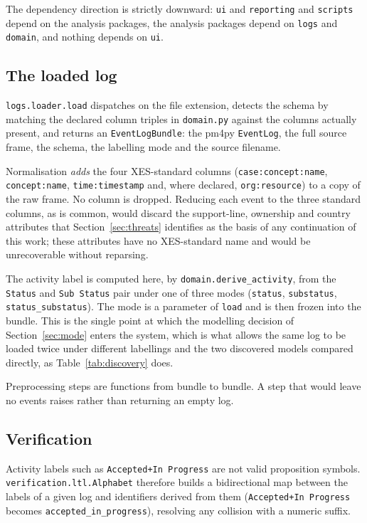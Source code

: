 \documentclass[12pt,a4paper]{article}
\newcommand{\act}[1]{\texttt{#1}}
\begin{document}
The dependency direction is strictly downward: \texttt{ui} and
\texttt{reporting} and \texttt{scripts} depend on the analysis packages, the
analysis packages depend on \texttt{logs} and \texttt{domain}, and nothing
depends on \texttt{ui}.

\subsection{The loaded log}

\texttt{logs.loader.load} dispatches on the file extension, detects the schema
by matching the declared column triples in \texttt{domain.py} against the
columns actually present, and returns an \texttt{EventLogBundle}: the pm4py
\texttt{EventLog}, the full source frame, the schema, the labelling mode and the
source filename.

Normalisation \emph{adds} the four XES-standard columns
(\texttt{case:concept:name}, \texttt{concept:name}, \texttt{time:timestamp} and,
where declared, \texttt{org:resource}) to a copy of the raw frame. No column is
dropped. Reducing each event to the three standard columns, as is common, would
discard the support-line, ownership and country attributes that
Section~\ref{sec:threats} identifies as the basis of any continuation of this
work; these attributes have no XES-standard name and would be unrecoverable
without reparsing.

The activity label is computed here, by \texttt{domain.derive\_activity}, from
the \act{Status} and \act{Sub Status} pair under one of three modes
(\texttt{status}, \texttt{substatus}, \texttt{status\_substatus}). The mode is a
parameter of \texttt{load} and is then frozen into the bundle. This is the
single point at which the modelling decision of Section~\ref{sec:mode} enters
the system, which is what allows the same log to be loaded twice under different
labellings and the two discovered models compared directly, as
Table~\ref{tab:discovery} does.

Preprocessing steps are functions from bundle to bundle. A step that would leave
no events raises rather than returning an empty log.

\subsection{Verification}

Activity labels such as \act{Accepted+In Progress} are not valid proposition
symbols. \texttt{verification.ltl.Alphabet} therefore builds a bidirectional map
between the labels of a given log and identifiers derived from them
(\act{Accepted+In Progress} becomes \texttt{accepted\_in\_progress}), resolving
any collision with a numeric suffix.
\end{document}
